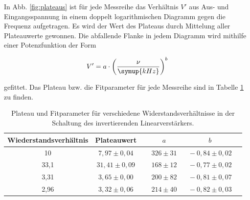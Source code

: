                 In Abb. \ref{fig:plateaus} ist für jede Messreihe das Verhältnis $V'$ aus
                Aus- und Eingangsspannung in einem doppelt logarithmischen Diagramm gegen die 
                Frequenz aufgetragen. Es wird der Wert des Plateaus durch Mittelung aller 
                Plateauwerte gewonnen. Die abfallende Flanke in jedem Diagramm wird mithilfe 
                einer Potenzfunktion der Form 

                \begin{equation}
                    V' = a\cdot\left(\frac{\nu}{\symup{kHz}}\right)^b
                \end{equation}

                gefittet. Das Plateau bzw. die Fitparameter für jede Messreihe sind in Tabelle 
                \ref{tab:fit} zu finden.

                \begin{table}
                    \centering
                    \caption{Plateau und Fitparameter für verschiedene Widerstandsverhältnisse in der Schaltung des 
                    invertierenden Linearverstärkers.}
                    \label{tab:fit}
                    \begin{tabular}{c c c c c}
                        \toprule
                            Wiederstandsverhältnis & Plateauwert & $\,\,\,\,\,\,\, a$ & $\,\,\,\, b$\\
                        \midrule
                            10   & $ 7,97 \pm 0,04 $ & $ \,\,\,\,\,\,\, 326\pm 31 $ & $ \,\,\,\, -0,84\pm 0,02 $ \\
                            33,1 & $31,41 \pm 0,09 $ & $ \,\,\,\,\,\,\, 168\pm 12 $ & $ \,\,\,\, -0,77\pm 0,02 $ \\
                            3,31 & $ 3,65 \pm 0,00 $ & $ \,\,\,\,\,\,\, 200\pm 82 $ & $ \,\,\,\, -0,81\pm 0,07 $ \\
                            2,96 & $ 3,32 \pm 0,06 $ & $ \,\,\,\,\,\,\, 214\pm 40 $ & $ \,\,\,\, -0,82\pm 0,03 $ \\
                        \bottomrule
                    \end{tabular}
                \end{table}


